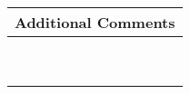 \documentclass[letterpaper, 10pt]{article} %
\begin{document}
\begin{tabular}{l}

\begin{minipage}{6in} \hspace*{-.175in} {\bf Additional Comments} \vspace*{.25in} \end{minipage} \\ \hline

\begin{minipage}{6in} \vspace*{.25in} \end{minipage} \\ \hline

\begin{minipage}{6in} \vspace*{.25in} \end{minipage} \\ \hline

\begin{minipage}{6in} \vspace*{.25in} \end{minipage} \\ \hline

\begin{minipage}{6in} \vspace*{.25in} \end{minipage} \\ \hline

\begin{minipage}{6in} \vspace*{.25in} \end{minipage} \\ \hline

\begin{minipage}{6in} \vspace*{.25in} \end{minipage} \\ \hline

\begin{minipage}{6in} \vspace*{.25in} \end{minipage} \\ \hline

\begin{minipage}{6in} \vspace*{.25in} \end{minipage} \\ \hline

\begin{minipage}{6in} \vspace*{.25in} \end{minipage} \\ \hline

\end{tabular}
\end{document}
